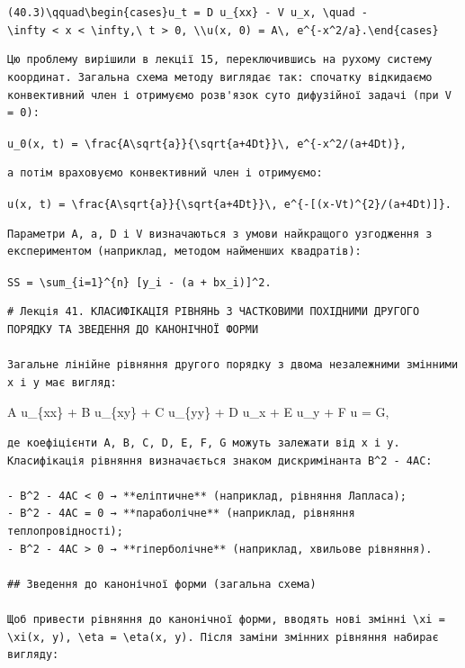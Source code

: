 \documentclass[
  ukrainian,
]{article}
\begin{document}
\texttt{(40.3)\textbackslash{}qquad\textbackslash{}begin\{cases\}u\_t\ =\ D\ u\_\{xx\}\ -\ V\ u\_x,\ \textbackslash{}quad\ -\textbackslash{}infty\ \textless{}\ x\ \textless{}\ \textbackslash{}infty,\textbackslash{}\ t\ \textgreater{}\ 0,\ \textbackslash{}\textbackslash{}u(x,\ 0)\ =\ A\textbackslash{},\ e\^{}\{-x\^{}2/a\}.\textbackslash{}end\{cases\}}

\begin{verbatim}
Цю проблему вирішили в лекції 15, переключившись на рухому систему координат. Загальна схема методу виглядає так: спочатку відкидаємо конвективний член і отримуємо розв'язок суто дифузійної задачі (при V = 0):
\end{verbatim}

\texttt{u\_0(x,\ t)\ =\ \textbackslash{}frac\{A\textbackslash{}sqrt\{a\}\}\{\textbackslash{}sqrt\{a+4Dt\}\}\textbackslash{},\ e\^{}\{-x\^{}2/(a+4Dt)\},}

\begin{verbatim}
а потім враховуємо конвективний член і отримуємо:
\end{verbatim}

\texttt{u(x,\ t)\ =\ \textbackslash{}frac\{A\textbackslash{}sqrt\{a\}\}\{\textbackslash{}sqrt\{a+4Dt\}\}\textbackslash{},\ e\^{}\{-{[}(x-Vt)\^{}\{2\}/(a+4Dt){]}\}.}

\begin{verbatim}
Параметри A, a, D і V визначаються з умови найкращого узгодження з експериментом (наприклад, методом найменших квадратів):
\end{verbatim}

\texttt{SS\ =\ \textbackslash{}sum\_\{i=1\}\^{}\{n\}\ {[}y\_i\ -\ (a\ +\ bx\_i){]}\^{}2.}

\begin{verbatim}
# Лекція 41. КЛАСИФІКАЦІЯ РІВНЯНЬ З ЧАСТКОВИМИ ПОХІДНИМИ ДРУГОГО ПОРЯДКУ ТА ЗВЕДЕННЯ ДО КАНОНІЧНОЇ ФОРМИ

Загальне лінійне рівняння другого порядку з двома незалежними змінними x і y має вигляд:
\end{verbatim}

A u\_\{xx\} + B u\_\{xy\} + C u\_\{yy\} + D u\_x + E u\_y + F u = G,

\begin{verbatim}
де коефіцієнти A, B, C, D, E, F, G можуть залежати від x і y. Класифікація рівняння визначається знаком дискримінанта B^2 - 4AC:

- B^2 - 4AC < 0 → **еліптичне** (наприклад, рівняння Лапласа);
- B^2 - 4AC = 0 → **параболічне** (наприклад, рівняння теплопровідності);
- B^2 - 4AC > 0 → **гіперболічне** (наприклад, хвильове рівняння).

## Зведення до канонічної форми (загальна схема)

Щоб привести рівняння до канонічної форми, вводять нові змінні \xi = \xi(x, y), \eta = \eta(x, y). Після заміни змінних рівняння набирає вигляду:
\end{verbatim}
\end{document}
